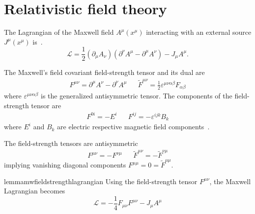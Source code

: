 \section{Relativistic field theory}

\begin{definition}
	The Lagrangian of the Maxwell field $A^\mu(x^\mu)$ interacting with an external source $J^\mu(x^\mu)$ is~\cite[p.~339]{Srednicki2007}.
	\begin{equation}
		\mathcal{L}
		=
		\frac{1}{2}
		(\partial_\mu A_\nu)
		\left(
			\partial^\nu A^\mu
			-
			\partial^\mu A^\nu
		\right)
		-
		J_\mu A^\mu
		\label{eq:mw_lagrangian}
		.
	\end{equation}
\end{definition}
\begin{definition}
	The Maxwell's field covariant field-strength tensor and its dual are
	\begin{align}
		F^{\mu\nu}
		=
		\partial^\mu A^\nu
		-
		\partial^\nu A^\mu
		&&
		\tilde{F}^{\mu\nu}
		=
		\frac{1}{2}
		\varepsilon^{\mu\nu\alpha\beta}
		F_{\alpha\beta}
		\label{eq:mw_field_strength_tensors}
	\end{align}
	where $\varepsilon^{\mu\nu\alpha\beta}$ is the generalized antisymmetric tensor.
	The components of the field-strength tensor are
	\begin{align}
		F^{0i}
		=
		-E^i
		&&
		F^{ij}
		=
		-\varepsilon^{ijk}B_k
		\label{eq:mw_field_strength_components}
	\end{align}
	where $E^i$ and $B_k$ are electric respective magnetic field components~\cite[p.~336]{Srednicki2007}.
\end{definition}
\begin{corollary}
	The field-strength tensors are antisymmetric
	\begin{align}
		F^{\mu\nu}
		=
		-
		F^{\nu\mu}
		&&
		\tilde{F}^{\mu\nu}
		=
		-
		\tilde{F}^{\nu\mu}
	\end{align}
	implying vanishing diagonal components $F^{\mu\mu}=0=\tilde{F}^{\mu\mu}$.
\end{corollary}
\begin{restatable}{lemma}{mwfieldstrengthlagrangian}\label{thm:mw_field_strength_lagrangian}
	Using the field-strength tensor $F^{\mu\nu}$, the Maxwell Lagrangian becomes
	\begin{equation}
		\mathcal{L}
		=
		-
		\frac{1}{4}
		F_{\mu\nu}
		F^{\mu\nu}
		-
		J_\mu A^\mu
		\label{eq:mw_field_strength_lagrangian}
	\end{equation}
\end{restatable}

